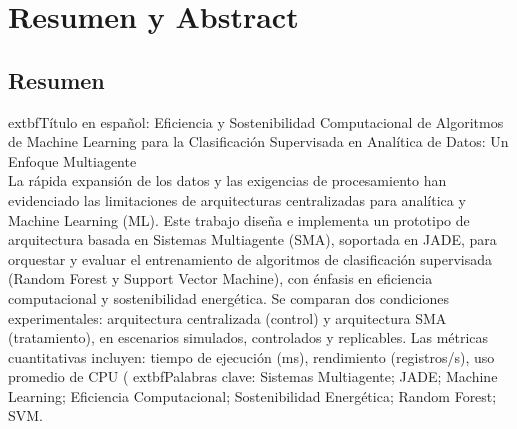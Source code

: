 \documentclass[12pt,twoside]{report}
\newcommand{\TrabajoTitulo}{Eficiencia y Sostenibilidad Computacional de Algoritmos de Machine Learning para la Clasificación Supervisada en Analítica de Datos: Un Enfoque Multiagente}
\begin{document}
\chapter*{Resumen y Abstract}

\section*{Resumen}
	extbf{Título en español:} \TrabajoTitulo\\[0.5em]
La rápida expansión de los datos y las exigencias de procesamiento han evidenciado las limitaciones de arquitecturas centralizadas para analítica y Machine Learning (ML). Este trabajo diseña e implementa un prototipo de arquitectura basada en Sistemas Multiagente (SMA), soportada en JADE, para orquestar y evaluar el entrenamiento de algoritmos de clasificación supervisada (Random Forest y Support Vector Machine), con énfasis en eficiencia computacional y sostenibilidad energética. Se comparan dos condiciones experimentales: arquitectura centralizada (control) y arquitectura SMA (tratamiento), en escenarios simulados, controlados y replicables. Las métricas cuantitativas incluyen: tiempo de ejecución (ms), rendimiento (registros/s), uso promedio de CPU (%
	extbf{Palabras clave:} Sistemas Multiagente; JADE; Machine Learning; Eficiencia Computacional; Sostenibilidad Energética; Random Forest; SVM.
\end{document}
